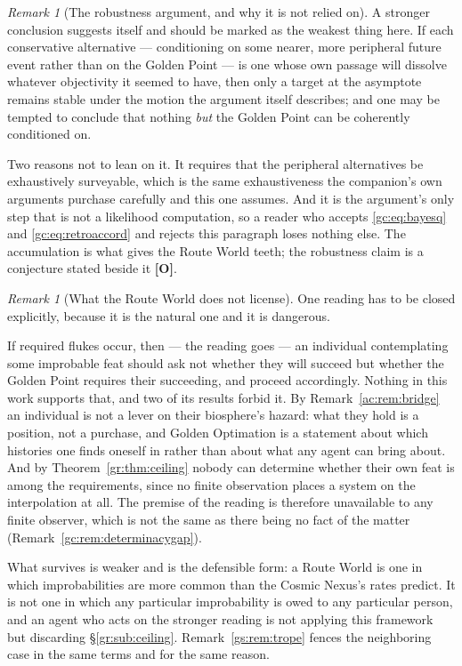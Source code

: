 \documentclass[11pt]{article}
\numberwithin{equation}{section}
\theoremstyle{plain}
\theoremstyle{definition}
\theoremstyle{remark}
\newtheorem{remark}[theorem]{Remark}
\begin{document}
\begin{remark}[The robustness argument, and why it is not relied on]
\label{gc:rem:routerobust}
A stronger conclusion suggests itself and should be marked as the
weakest thing here. If each conservative alternative --- conditioning on
some nearer, more peripheral future event rather than on the Golden
Point --- is one whose own passage will dissolve whatever objectivity it
seemed to have, then only a target at the asymptote remains stable under
the motion the argument itself describes; and one may be tempted to
conclude that nothing \emph{but} the Golden Point can be coherently
conditioned on.

Two reasons not to lean on it. It requires that the peripheral
alternatives be exhaustively surveyable, which is the same
exhaustiveness the companion's own arguments purchase carefully and this
one assumes. And it is the argument's only step that is not a
likelihood computation, so a reader who accepts \eqref{gc:eq:bayesq} and
\eqref{gc:eq:retroaccord} and rejects this paragraph loses nothing else.
The accumulation is what gives the Route World teeth; the robustness
claim is a conjecture stated beside it \textbf{[O]}.
\end{remark}

\begin{remark}[What the Route World does not license]
\label{gc:rem:routefence}
One reading has to be closed explicitly, because it is the natural one
and it is dangerous.

If required flukes occur, then --- the reading goes --- an individual
contemplating some improbable feat should ask not whether they will
succeed but whether the Golden Point requires their succeeding, and
proceed accordingly. Nothing in this work supports that, and two of its
results forbid it. By Remark~\ref{ac:rem:bridge} an individual is not a
lever on their biosphere's hazard: what they hold is a position, not a
purchase, and Golden Optimation is a statement about which histories one
finds oneself in rather than about what any agent can bring about. And
by Theorem~\ref{gr:thm:ceiling} nobody can determine whether their own
feat is among the requirements, since no finite observation places a
system on the interpolation at all. The premise of the reading is therefore
unavailable to any finite observer, which is not the same as there being
no fact of the matter (Remark~\ref{gc:rem:determinacygap}).

What survives is weaker and is the defensible form: a Route World is one in
which improbabilities are more common than the Cosmic Nexus's rates
predict. It is not one in which any particular improbability is owed to
any particular person, and an agent who acts on the stronger reading is
not applying this framework but discarding
\S\ref{gr:sub:ceiling}. Remark~\ref{gs:rem:trope} fences the neighboring
case in the same terms and for the same reason.
\end{remark}
\end{document}
